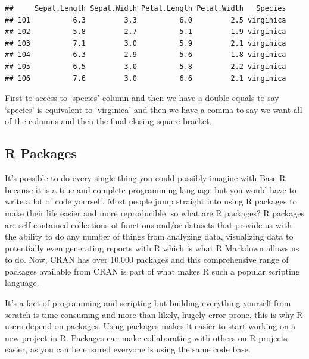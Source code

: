\documentclass[
]{article}
\newenvironment{Shaded}{\begin{snugshade}}{\end{snugshade}}
\newcommand{\FunctionTok}[1]{\textcolor[rgb]{0.00,0.00,0.00}{#1}}
\newcommand{\NormalTok}[1]{#1}
\newcommand{\SpecialCharTok}[1]{\textcolor[rgb]{0.00,0.00,0.00}{#1}}
\newcommand{\StringTok}[1]{\textcolor[rgb]{0.31,0.60,0.02}{#1}}
\begin{document}
\begin{Shaded}
\end{Shaded}

\begin{verbatim}
##     Sepal.Length Sepal.Width Petal.Length Petal.Width   Species
## 101          6.3         3.3          6.0         2.5 virginica
## 102          5.8         2.7          5.1         1.9 virginica
## 103          7.1         3.0          5.9         2.1 virginica
## 104          6.3         2.9          5.6         1.8 virginica
## 105          6.5         3.0          5.8         2.2 virginica
## 106          7.6         3.0          6.6         2.1 virginica
\end{verbatim}

First to access to `species' column and then we have a double equals to say `species' is equivalent to `virginica' and then we have a comma to say we want all of the columns and then the final closing square bracket.

\hypertarget{r-packages}{%
\subsection{R Packages}\label{r-packages}}

It's possible to do every single thing you could possibly imagine with Base-R because it is a true and complete programming language but you would have to write a lot of code yourself. Most people jump straight into using R packages to make their life easier and more reproducible, so what are R packages? R packages are self-contained collections of functions and/or datasets that provide us with the ability to do any number of things from analyzing data, visualizing data to potentially even generating reports with R which is what R Markdown allows us to do. Now, CRAN has over 10,000 packages and this comprehensive range of packages available from CRAN is part of what makes R such a popular scripting language.

It's a fact of programming and scripting but building everything yourself from scratch is time consuming and more than likely, hugely error prone, this is why R users depend on packages. Using packages makes it easier to start working on a new project in R. Packages can make collaborating with others on R projects easier, as you can be ensured everyone is using the same code base.
\end{document}
